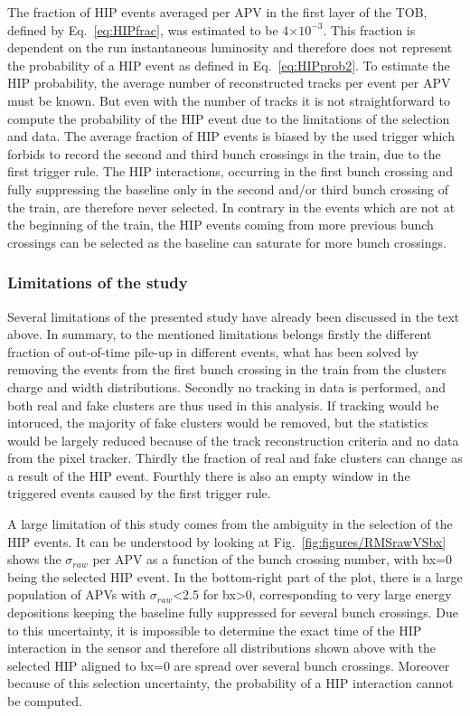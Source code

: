 The fraction of HIP events averaged per APV in the first layer of the TOB, defined by Eq.~\ref{eq:HIPfrac}, was estimated to be 4$\times 10^{-3}$. This fraction is dependent on the run instantaneous luminosity and therefore does not represent the probability of a HIP event as defined in Eq.~\ref{eq:HIPprob2}. To estimate the HIP probability, the average number of reconstructed tracks per event per APV must be known. But even with the number of tracks it is not straightforward to compute the probability of the HIP event due to the limitations of the selection and data. The average fraction of HIP events is biased by the used trigger which forbids to record the second and third bunch crossings in the train, due to the first trigger rule. The HIP interactions, occurring in the first bunch crossing and fully suppressing the baseline only in the second and/or third bunch crossing of the train, are therefore never selected. In contrary in the events which are not at the beginning of the train, the HIP events coming from more previous bunch crossings can be selected as the baseline can saturate for more bunch crossings.
 

\subsubsection{Limitations of the study~\label{sec:limitationsSelection}}

Several limitations of the presented study have already been discussed in the text above. In summary, to the mentioned limitations belongs firstly the different fraction of out-of-time pile-up in different events, what has been solved by removing the events from the first bunch crossing in the train from the clusters charge and width distributions. Secondly no tracking in data is performed, and both real and fake clusters are thus used in this analysis. If tracking would be intoruced, the majority of fake clusters would be removed, but the statistics would be largely reduced because of the track reconstruction criteria and no data from the pixel tracker. Thirdly the fraction of real and fake clusters can change as a result of the HIP event. Fourthly there is also an empty window in the triggered events caused by the first trigger rule.


A large limitation of this study comes from the ambiguity in the selection of the HIP events. It can be understood by looking at Fig.~\ref{fig:figures/RMSrawVSbx} shows the $\sigma_{raw}$ per APV as a function of the bunch crossing number, with bx=0 being the selected HIP event. In the bottom-right part of the plot, there is a large population of APVs with $\sigma_{raw}$<2.5 for bx>0, corresponding to very large energy depositions keeping the baseline fully suppressed for several bunch crossings. Due to this uncertainty, it is impossible to determine the exact time of the HIP interaction in the sensor and therefore all distributions shown above with the selected HIP aligned to bx=0 are spread over several bunch crossings. Moreover because of this selection uncertainty, the probability of a HIP interaction cannot be computed. 

